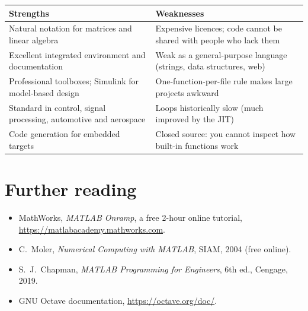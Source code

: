 \begin{center}
\small
\begin{tabularx}{\linewidth}{@{}>{\raggedright\arraybackslash}X>{\raggedright\arraybackslash}X@{}}
\toprule
\textbf{Strengths} & \textbf{Weaknesses}\\
\midrule
Natural notation for matrices and linear algebra & Expensive licences; code cannot be shared with people who lack them\\
Excellent integrated environment and documentation & Weak as a general-purpose language (strings, data structures, web)\\
Professional toolboxes; Simulink for model-based design & One-function-per-file rule makes large projects awkward\\
Standard in control, signal processing, automotive and aerospace & Loops historically slow (much improved by the JIT)\\
Code generation for embedded targets & Closed source: you cannot inspect how built-in functions work\\
\bottomrule
\end{tabularx}
\end{center}

\section{Further reading}
\begin{itemize}
\item MathWorks, \emph{MATLAB Onramp}, a free 2-hour online tutorial,
  \url{https://matlabacademy.mathworks.com}.
\item C.~Moler, \emph{Numerical Computing with MATLAB}, SIAM, 2004 (free online).
\item S.~J.~Chapman, \emph{MATLAB Programming for Engineers}, 6th ed., Cengage, 2019.
\item GNU Octave documentation, \url{https://octave.org/doc/}.
\end{itemize}

